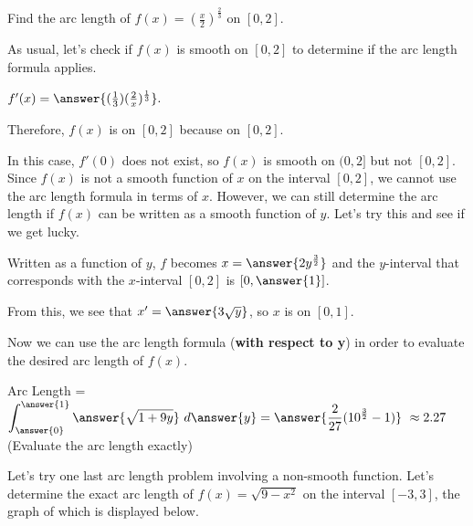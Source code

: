 \documentclass[handout,nooutcomes]{ximera}
\begin{document}
\begin{problem}
Find the arc length of $f(x) = \left(\frac{x}{2}\right)^{\frac{2}{3}}$ on $[0,2]$.  

As usual, let's check if $f(x)$ is smooth on $[0,2]$ to determine if the arc length formula applies.

$f'(x) = \answer{(\frac{1}{3})(\frac{2}{x})^{\frac{1}{3}}}.$ 

Therefore, $f(x)$ is  on $[0,2]$ because  on $[0,2]$.  

\begin{problem}
In this case, $f'(0)$ does not exist, so $f(x)$ is smooth on $(0,2]$ but not $[0,2]$.  Since $f(x)$ is not a smooth function of $x$ on the interval $[0,2]$, we cannot use the arc length formula in terms of $x$.  However, we can still determine the arc length if $f(x)$ can be written as a smooth function of $y$.  Let's try this and see if we get lucky.  

Written as a function of $y$, $f$ becomes $x = \answer{2y^{\frac{3}{2}}}$ and the $y$-interval that corresponds with the $x$-interval $[0,2]$ is $[0, \answer{1}]$.  

\begin{problem}
From this, we see that $x' = \answer{3\sqrt{y}}$, so $x$ is  on $[0,1]$.  

\begin{problem}
Now we can use the arc length formula (\textbf{with respect to y}) in order to evaluate the desired arc length of $f(x).$

Arc Length = $\displaystyle\int_{\answer{0}}^{\answer{1}} \answer{\sqrt{1+9y}} \ d\answer{y} = \answer{\frac{2}{27}(10^{\frac{3}{2}}-1)} \ \approx 2.27$ (Evaluate the arc length exactly)

\end{problem}
\end{problem}
\end{problem}
\end{problem}


Let's try one last arc length problem involving a non-smooth function.  Let's determine the exact arc length of $f(x) = \sqrt{9-x^2}$ on the interval $[-3,3]$, the graph of which is displayed below.
\end{document}
